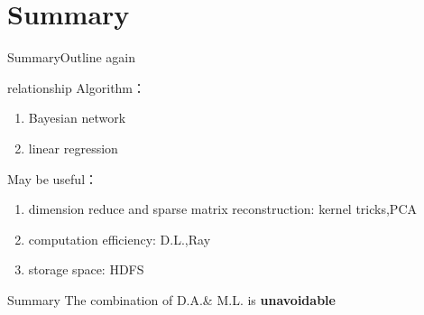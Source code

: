 \documentclass{beamer}
\begin{document}
\section{Summary}



\begin{frame}{Summary}{Outline again}

\begin{block}{relationship}
Algorithm：\\
\begin{enumerate}
\item Bayesian network
\item linear regression
\end{enumerate}

May be useful：\\
\begin{enumerate}
\item dimension reduce and sparse matrix reconstruction: kernel tricks,PCA
\item computation efficiency: D.L.,Ray
\item storage space: HDFS
\end{enumerate}

\end{block}

\end{frame}


\begin{frame}{Summary}{}
 The combination of D.A.\& M.L. is \huge{ \textbf{unavoidable}}

\end{frame}
\end{document}
